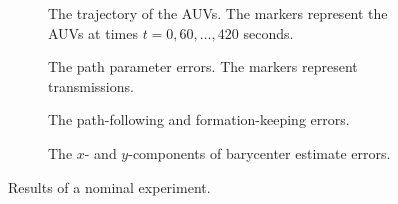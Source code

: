 \begin{figure}[p]
    \begin{minipage}{0.48\textwidth}
        \begin{subfigure}{\textwidth}
            
            \vspace{-2mm}
            \caption{The trajectory of the AUVs. The markers represent the AUVs at times $t = 0, 60, \ldots, 420$ seconds.}
            \label{fig:distr_NSB_experiment_nominal_trajectory}
        \end{subfigure}

        \vspace{-1mm}

        \begin{subfigure}{\textwidth}
            
            \vspace{-3mm}
            \caption{The path parameter errors. The markers represent transmissions.}
            \label{fig:distr_NSB_experiment_nominal_parameter}
        \end{subfigure}
    \end{minipage}
    \hspace{\fill}
    \begin{minipage}{0.48\textwidth}

        \hspace*{\fill}
        \begin{subfigure}{\textwidth}
            \hspace*{-5mm}
            
            \vspace{-3mm}
            \caption{The path-following and formation-keeping errors.}
            \label{fig:distr_NSB_experiment_nominal_errors}
        \end{subfigure}


        \hspace*{\fill}
        \begin{subfigure}{\textwidth}
            \hspace*{-5mm}
            
            \vspace{-3mm}
            \caption{The $x$- and $y$-components of barycenter estimate errors.}
            \label{fig:distr_NSB_experiment_nominal_barycenter}
        \end{subfigure}
    \end{minipage}

    \vspace*{-3mm}
    \caption{Results of a nominal experiment.}
    \label{fig:distr_NSB_experiment_nominal}
\end{figure}

